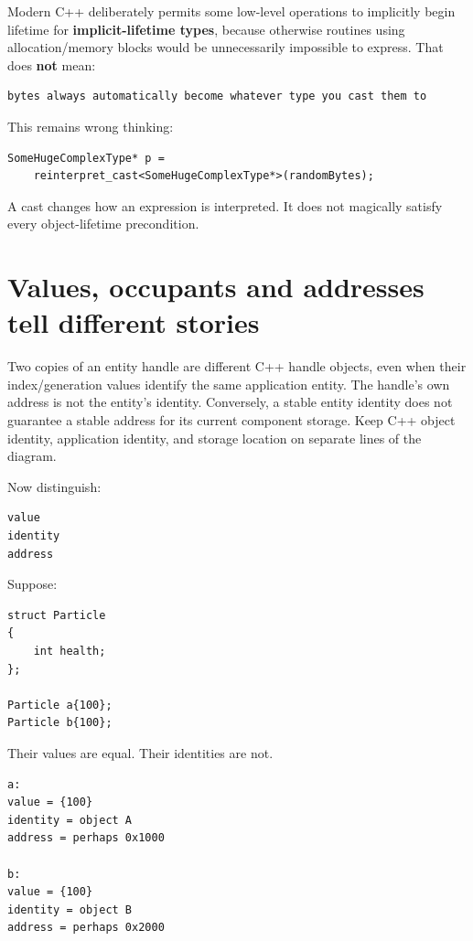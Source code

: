 Modern C++ deliberately permits some low-level operations to implicitly begin lifetime for \textbf{implicit-lifetime types}, because otherwise routines using allocation/memory blocks would be unnecessarily impossible to express. That does \textbf{not} mean:

\begin{verbatim}
bytes always automatically become whatever type you cast them to
\end{verbatim}

This remains wrong thinking:

\begin{verbatim}
SomeHugeComplexType* p =
    reinterpret_cast<SomeHugeComplexType*>(randomBytes);
\end{verbatim}

A cast changes how an expression is interpreted. It does not magically satisfy every object-lifetime precondition.

\section{Values, occupants and addresses tell different stories}\label{05-engine-i-ch002-values-occupants-and-addresses-tell-different-stories}

Two copies of an entity handle are different C++ handle objects, even when their index/generation values identify the same application entity. The handle's own address is not the entity's identity. Conversely, a stable entity identity does not guarantee a stable address for its current component storage. Keep C++ object identity, application identity, and storage location on separate lines of the diagram.

Now distinguish:

\begin{verbatim}
value
identity
address
\end{verbatim}

Suppose:

\begin{verbatim}
struct Particle
{
    int health;
};

Particle a{100};
Particle b{100};
\end{verbatim}

Their values are equal. Their identities are not.

\begin{verbatim}
a:
value = {100}
identity = object A
address = perhaps 0x1000

b:
value = {100}
identity = object B
address = perhaps 0x2000
\end{verbatim}

